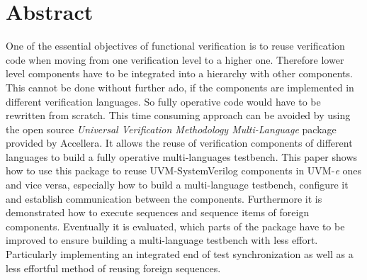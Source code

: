 \section*{Abstract}
One of the essential objectives of functional verification is to reuse verification code when moving from one verification level to a higher one. Therefore lower level components have to be integrated into a hierarchy with other components. This cannot be done without further ado, if the components are implemented in different verification languages. So fully operative code would have to be rewritten from scratch. This time consuming approach can be avoided by using the open source \emph{Universal Verification Methodology Multi-Language} package provided by Accellera. It allows the reuse of verification components of different languages to build a fully operative multi-languages testbench. This paper shows how to use this package to reuse UVM-SystemVerilog components in UVM-\textit{e} ones and vice versa, especially how to build a multi-language testbench, configure it and establish communication between the components. Furthermore it is demonstrated how to execute sequences and sequence items of foreign components. Eventually it is evaluated, which parts of the package have to be improved to ensure building a multi-language testbench with less effort. Particularly implementing an integrated end of test synchronization as well as a less effortful method of reusing foreign sequences.